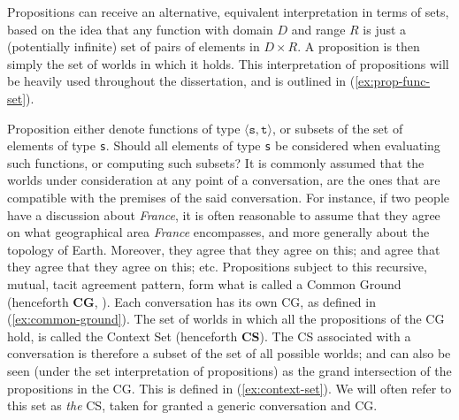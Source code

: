 \begin{exe}
	\label{ex:prop-func}
\end{exe}

Propositions can receive an alternative, equivalent interpretation in terms of sets, based on the idea that any function with domain $D$ and range $R$ is just a (potentially infinite) set of pairs of elements in $D\times R$. A proposition is then simply the set of worlds in which it holds. This interpretation of propositions will be heavily used throughout the dissertation, and is outlined in (\ref{ex:prop-func-set}). 

\begin{exe}
	\label{ex:prop-func-set}
\end{exe}

Proposition either denote functions of type $\langle \texttt{s}, \texttt{t}\rangle$, or subsets of the set of elements of type \texttt{s}. Should all elements of type \texttt{s} be considered when evaluating such functions, or computing such subsets? It is commonly assumed that the worlds under consideration at any point of a conversation, are the ones that are compatible with the premises of the said conversation. For instance, if two people have a discussion about \textit{France}, it is often reasonable to assume that they agree on what geographical area \textit{France} encompasses, and more generally about the topology of Earth. Moreover, they agree that they agree on this; and agree that they agree that they agree on this; etc. Propositions subject to this recursive, mutual, tacit agreement pattern, form what is called a Common Ground (henceforth \textbf{CG}, \citep{Stalnaker1974, Stalnaker1978}). Each conversation has its own CG, as defined in (\ref{ex:common-ground}). The set of worlds in which all the propositions of the CG hold, is called the Context Set (henceforth \textbf{CS}). The CS associated with a conversation is therefore a subset of the set of all possible worlds; and can also be seen (under the set interpretation of propositions) as the grand intersection of the propositions in the CG. This is defined in (\ref{ex:context-set}). We will often refer to this set as \textit{the} CS, taken for granted a generic conversation and CG.

